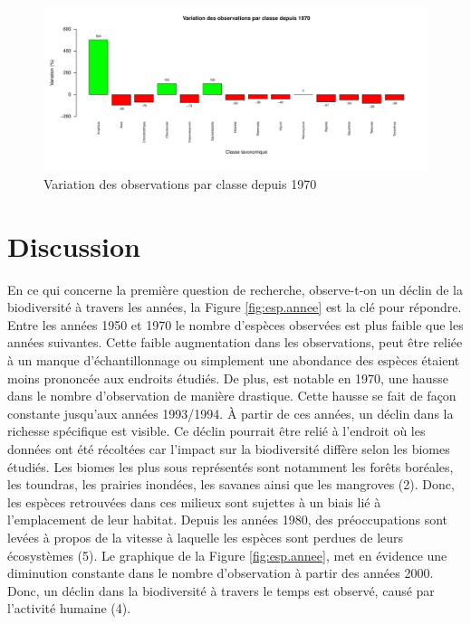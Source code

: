 \documentclass[9pt,twocolumn,twoside,]{pnas-new}
\begin{document}
\begin{figure}
\includegraphics[width=1\linewidth]{../Figures/figure_3_declin_classe} \caption{\label{fig:declin} Variation des observations par classe depuis 1970}\label{fig:fig.declin}
\end{figure}

\section{Discussion}\label{discussion}

En ce qui concerne la première question de recherche, observe-t-on un
déclin de la biodiversité à travers les années, la Figure
\ref{fig:esp.annee} est la clé pour répondre. Entre les années 1950 et
1970 le nombre d'espèces observées est plus faible que les années
suivantes. Cette faible augmentation dans les observations, peut être
reliée à un manque d'échantillonnage ou simplement une abondance des
espèces étaient moins prononcée aux endroits étudiés. De plus, est
notable en 1970, une hausse dans le nombre d'observation de manière
drastique. Cette hausse se fait de façon constante jusqu'aux années
1993/1994. À partir de ces années, un déclin dans la richesse spécifique
est visible. Ce déclin pourrait être relié à l'endroit où les données
ont été récoltées car l'impact sur la biodiversité diffère selon les
biomes étudiés. Les biomes les plus sous représentés sont notamment les
forêts boréales, les toundras, les prairies inondées, les savanes ainsi
que les mangroves (2). Donc, les espèces retrouvées dans ces milieux
sont sujettes à un biais lié à l'emplacement de leur habitat. Depuis les
années 1980, des préoccupations sont levées à propos de la vitesse à
laquelle les espèces sont perdues de leurs écosystèmes (5). Le graphique
de la Figure \ref{fig:esp.annee}, met en évidence une diminution
constante dans le nombre d'observation à partir des années 2000. Donc,
un déclin dans la biodiversité à travers le temps est observé, causé par
l'activité humaine (4).
\end{document}
